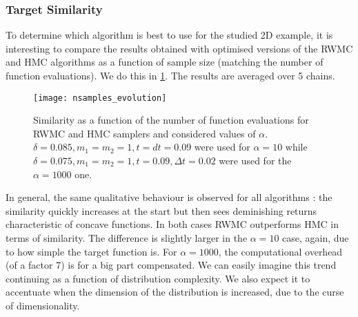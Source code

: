 \documentclass[a4paper, 12pt,oneside]{article}
\begin{document}
		\subsubsection{Target Similarity}\label{sec:target-similarity}
		To determine which algorithm is best to use for the studied 2D example, it is interesting to compare the results obtained with optimised versions of the RWMC and HMC algorithms as a function of sample size (matching the number of function evaluations). We do this in \ref{fig:nsamples-evolution}. The results are averaged over 5 chains.
		\begin{figure}[htb]
			\centering
				\vspace{0em}
				\texttt{[image: nsamples\_evolution]}
				\caption{Similarity as a function of the number of function evaluations for RWMC and HMC samplers and considered values of $\alpha$. $\delta=0.085,m_1=m_2=1,t=dt=0.09$ were used for $\alpha=10$ while $\delta=0.075,m_1=m_2=1,t=0.09,\Delta t=0.02$ were used for the $\alpha=1000$ one.}
				\label{fig:nsamples-evolution}
		\end{figure}
		In general, the same qualitative behaviour is observed for all algorithms : the similarity quickly increases at the start but then sees deminishing returns characteristic of concave functions. In both cases RWMC outperforms HMC in terms of similarity. 
		The difference is slightly larger in the $\alpha=10$ case, again, due to how simple the target function is. For $\alpha=1000$, the computational overhead (of a factor 7) is for a big part compensated. We can easily imagine this trend continuing as a function of distribution complexity. We also expect it to accentuate when the dimension of the distribution is increased, due to the curse of dimensionality. 
\end{document}
